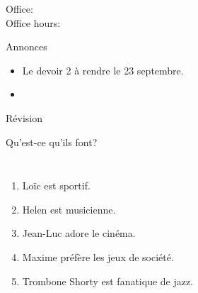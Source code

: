 \documentclass{beamer}
\subtitle[Nos loisirs]{Nos loisirs}
\begin{document}
  \begin{frame}
    \titlepage
    \tiny{Office: \\
          Office hours: }
  \end{frame}

  \begin{frame}{Annonces}
    \begin{itemize}
      \item Le devoir 2 à rendre le 23 septembre.
      \item[] 
    \end{itemize}
  \end{frame}

  \begin{frame}{Révision}
    \begin{center}
      
    \end{center}
  \end{frame}

  \begin{frame}{Qu'est-ce qu'ils font?}
    \begin{columns}
        \begin{enumerate}
          \item Loïc est sportif.
          \item<2-> Helen est musicienne.
          \item<3-> Jean-Luc adore le cinéma.
          \item<4-> Maxime préfère les jeux de société.
          \item<5-> Trombone Shorty est fanatique de jazz.
        \end{enumerate}
        \begin{minipage}[t][0.6\textheight]{\linewidth}
        \end{minipage}
    \end{columns}
  \end{frame}
\end{document}
